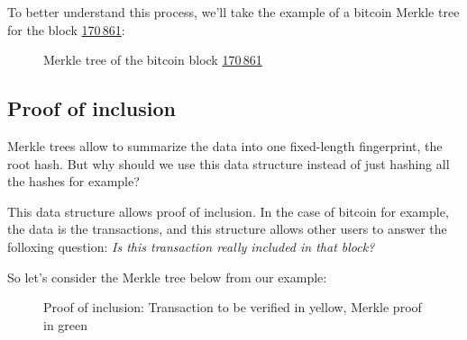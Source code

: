 To better understand this process, we'll take the example of a bitcoin Merkle tree for the block \href{https://blockchair.com/bitcoin/block/170861}{170 861}:

\begin{figure}[H]
    \centering
{}
    \caption{Merkle tree of the bitcoin block \href{"https://blockchair.com/bitcoin/block/170861"}{170 861}}
    \label{fig:Merkletree}
\end{figure}

\subsection{Proof of inclusion} \label{Merkle:inclusion}

Merkle trees allow to summarize the data into one fixed-length fingerprint, the root hash. 
But why should we use this data structure instead of just hashing all the hashes for example?

This data structure allows proof of inclusion. In the case of bitcoin for example, the data is the transactions, and this structure allows other users to answer the folloxing question: \textit{Is this transaction really included in that block?}

So let's consider the Merkle tree below from our example:


\begin{figure}[H]
    \centering
{}
    \caption{Proof of inclusion: Transaction to be verified in yellow, Merkle proof in green}
    \label{fig:Merkleproof}
\end{figure}


